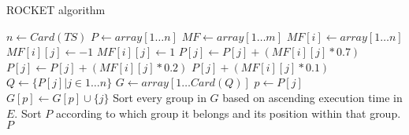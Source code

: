 \begin{algorithm}[h!]
\caption{ROCKET algorithm}
\label{alg:rocket}
\begin{algorithmic}[1]
		\State $n \gets Card(TS)$
		\State $P \gets array[1 \dots n]$ 
		\State $MF \gets array[1 \dots m]$
			\State $MF[i] \gets array[1 \dots n]$
					$MF[i][j] \gets -1$
				\Else{}
					$MF[i][j] \gets 1$
				\EndIf
			\EndFor
		\EndFor
					$P[j] \gets P[j] + (MF[i][j] * 0.7)$
					$P[j] \gets P[j] + (MF[i][j] * 0.2)$
				\Else{}
					$P[j] + (MF[i][j] * 0.1)$
				\EndIf
			\EndFor
		\EndFor
		\State $Q \gets \{P[j] \vert j \in 1 \dots n\}$ 
		\State $G \gets array[1 \dots Card(Q)]$ 
			\State $p \gets P[j]$
			\State $G[p] \gets G[p] \cup \{j\}$
		\EndFor
		\State Sort every group in $G$ based on ascending execution time in $E$.
		\State Sort $P$ according to which group it belongs and its position within that group.
		\State \Return $P$
	\EndProcedure
\end{algorithmic}
\end{algorithm}
